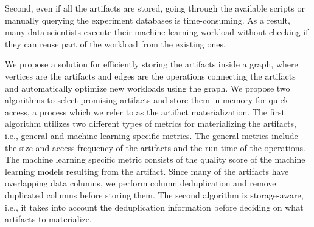 Second, even if all the artifacts are stored, going through the available scripts or manually querying the experiment databases is time-consuming. 
As a result, many data scientists execute their machine learning workload without checking if they can reuse part of the workload from the existing ones. 

We propose a solution for efficiently storing the artifacts inside a graph, where vertices are the artifacts and edges are the operations connecting the artifacts and automatically optimize new workloads using the graph.
We propose two algorithms to select promising artifacts and store them in memory for quick access, a process which we refer to as the artifact materialization.
The first algorithm utilizes two different types of metrics for materializing the artifacts, i.e., general and machine learning specific metrics.
The general metrics include the size and access frequency of the artifacts and the run-time of the operations.
The machine learning specific metric consists of the quality score of the machine learning models resulting from the artifact.
Since many of the artifacts have overlapping data columns, we perform column deduplication and remove duplicated columns before storing them.
The second algorithm is storage-aware, i.e., it takes into account the deduplication information before deciding on what artifacts to materialize.

